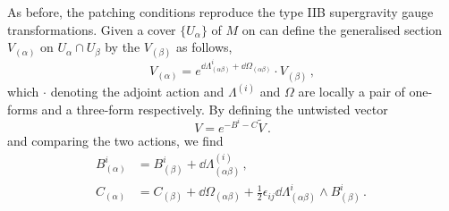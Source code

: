 \documentclass[debug]{phd}
\begin{document}
As before, the patching conditions reproduce the type IIB supergravity gauge transformations.
Given a cover $\{U_{\alpha}\}$ of $M$ on can define the generalised section $V_{(\alpha)}$ on $U_\alpha \cap U_\beta$ by the $V_{(\beta)}$ as follows,
								\begin{equation}
									V_{(\alpha)} = e^{\dd \Lambda^i_{(\alpha\beta)} + \dd \Omega_{(\alpha\beta)}} \cdot V_{(\beta)}\, ,
								\end{equation}
				which $\cdot$ denoting the adjoint action and $\Lambda^{(i)}$ and $\Omega$ are locally a pair of one-forms and a three-form respectively.		
By defining the untwisted vector 	
\begin{equation}\label{twistVecIIB}
									V = e^{-B^i - C} \tilde{V} \, .
								\end{equation}		
and comparing the two actions, we find 
\begin{equation}
									\begin{split}
										B^{i}_{(\alpha)} 	& = B^{i}_{(\beta)} + \dd \Lambda^{(i)}_{(\alpha \beta)} \, , \\
										C_{(\alpha)}	& = C_{(\beta)} + \dd \Omega_{(\alpha\beta)} + \frac{1}{2} \epsilon_{ij} \dd \Lambda^i_{(\alpha \beta)} \wedge B^i_{(\beta)} \, .\
									\end{split}
								\end{equation}
\end{document}
